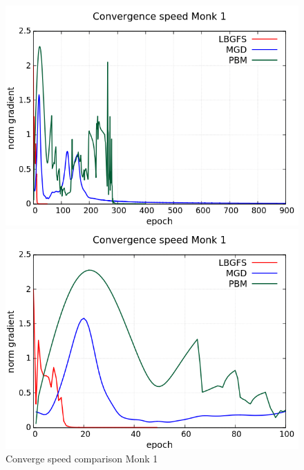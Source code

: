 \begin{figure}[H]
	\centering
	\begin{minipage}[t]{0.5\linewidth}
		\includegraphics[width=\linewidth]{data/Comparison/Monk1/Monk1_CS_Comparison_standard.png}
	\end{minipage}%
	\begin{minipage}[t]{0.5\linewidth}
		\includegraphics[width=\linewidth]{data/Comparison/Monk1/Monk1_CS_Comparison_zoom.png}
	\end{minipage}
	\caption{Converge speed comparison Monk 1}
	\label{CS-Monk1}
\end{figure}
